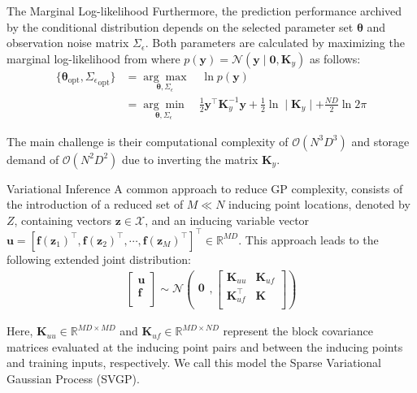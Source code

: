 \documentclass[10pt, xcolor=table]{beamer}
\begin{document}
\begin{frame}{The Marginal Log-likelihood}
	 Furthermore, the prediction performance archived by the conditional distribution depends on the selected parameter set $\bm{\theta}$ and observation noise matrix $\Sigma_\epsilon$. Both parameters are calculated by maximizing the marginal log-likelihood from  where $p(\mathbf{y}) = \mathcal{N}(\mathbf{y} \mid \bm{0}, \mathbf{K}_y)$ as follows:
	\begin{equation}\label{eq:sogp_nlml_opt}
	\begin{aligned}
	\{\bm{\theta}_{\text{opt}}, {\Sigma_\epsilon}_{\text{opt}}\} &= \underset{\bm{\theta}, \Sigma_\epsilon}{\arg\max} \quad \ln p(\mathbf{y})\\
	&= \underset{\bm{\theta}, \Sigma_\epsilon}{\arg\min} \quad \frac{1}{2} \mathbf{y}^\top \mathbf{K}_y^{-1} \mathbf{y} + \frac{1}{2} \ln \mid \mathbf{K}_y \mid + \frac{ND}{2} \ln 2\pi
	\end{aligned}
	\end{equation}
	
	The main challenge is their computational complexity of $\mathcal{O}(N^3D^3)$ and storage demand of $\mathcal{O}(N^2D^2)$ due to inverting the matrix $\mathbf{K}_y$.
\end{frame}

\begin{frame}{Variational Inference}
	A common approach to reduce GP complexity, consists of the introduction of a reduced set of $M \ll N$ inducing point locations, denoted by $Z$, containing vectors $\mathbf{z} \in \mathcal{X}$, and an inducing variable vector $\mathbf{u} = [\bm{f}(\bm{z}_1)^\top, \bm{f}(\bm{z}_2)^\top, \cdots, \bm{f}(\bm{z}_{M})^\top]^\top \in \mathbb{R}^{M D}$. This approach leads to the following extended joint distribution:
	\begin{equation}
	\begin{array}{rcl}
	\left[ \begin{array}{c}
	\mathbf{u}\\
	\mathbf{f}\\
	\end{array}
	\right]
	\sim
	\mathcal{N} \left(
	\begin{array}{c}
	\mathbf{0}\\
	\end{array},
	\left[ \begin{array}{cc}
	\mathbf{K}_{uu} & \mathbf{K}_{uf}\\
	\mathbf{K}_{uf}^\top & \mathbf{K}\\
	\end{array}
	\right] \right)
	\end{array}
	\end{equation}
	
	Here, $\mathbf{K}_{uu} \in \mathbb{R}^{MD \times MD}$ and $\mathbf{K}_{uf} \in \mathbb{R}^{MD \times ND}$ represent the block covariance matrices evaluated at the inducing point pairs and between the inducing points and training inputs, respectively. We call this model the Sparse Variational Gaussian Process (SVGP). 
	
\end{frame}
\end{document}
